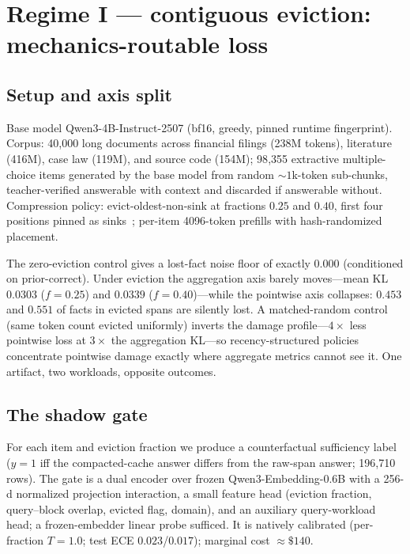 \documentclass[11pt]{article}
\newcommand{\evfrac}[1]{$f{=}#1$}
\begin{document}
\section{Regime I --- contiguous eviction: mechanics-routable loss}
\label{sec:eviction}

\subsection{Setup and axis split}
\label{sec:split}
Base model Qwen3-4B-Instruct-2507 (bf16, greedy, pinned runtime
fingerprint). Corpus: 40{,}000 long documents across financial filings
(238M tokens), literature (416M), case law (119M), and source code (154M);
98{,}355 extractive multiple-choice items generated by the base model from
random ${\sim}1$k-token sub-chunks, teacher-verified answerable with context
and discarded if answerable without. Compression policy:
evict-oldest-non-sink at fractions $0.25$ and $0.40$, first four positions
pinned as sinks~\citep{xiao2024streamingllm}; per-item 4096-token prefills
with hash-randomized placement.

The zero-eviction control gives a lost-fact noise floor of exactly $0.000$
(conditioned on prior-correct). Under eviction the aggregation axis barely
moves---mean KL $0.0303$ (\evfrac{0.25}) and $0.0339$
(\evfrac{0.40})---while the pointwise axis collapses: $\mathbf{0.453}$ and
$\mathbf{0.551}$ of facts in evicted spans are silently lost. A
matched-random control (same token count evicted uniformly) inverts the
damage profile---$4\times$ less pointwise loss at $3\times$ the aggregation
KL---so recency-structured policies concentrate pointwise damage exactly
where aggregate metrics cannot see it. One artifact, two workloads, opposite
outcomes.

\subsection{The shadow gate}
\label{sec:shadowgate}
For each item and eviction fraction we produce a counterfactual sufficiency
label ($y{=}1$ iff the compacted-cache answer differs from the raw-span
answer; 196{,}710 rows). The gate is a dual encoder over frozen
Qwen3-Embedding-0.6B with a 256-d normalized projection interaction, a small
feature head (eviction fraction, query--block overlap, evicted flag,
domain), and an auxiliary query-workload head; a frozen-embedder linear
probe sufficed. It is natively calibrated (per-fraction $T{=}1.0$; test ECE
$0.023$/$0.017$); marginal cost ${\approx}\$140$.
\end{document}

